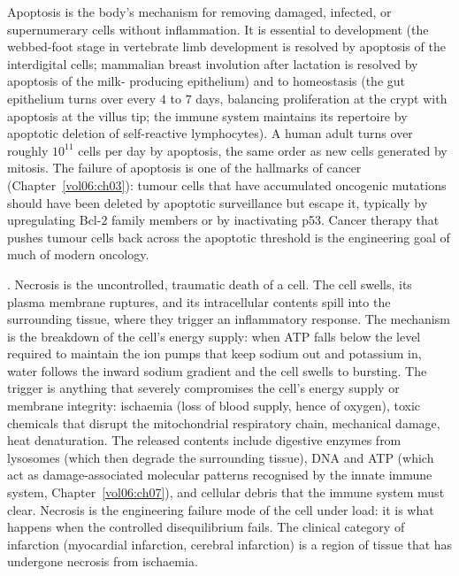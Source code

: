 Apoptosis is the body's mechanism for removing damaged, infected, or
supernumerary cells without inflammation. It is essential to
development (the webbed-foot stage in vertebrate limb development is
resolved by apoptosis of the interdigital cells; mammalian breast
involution after lactation is resolved by apoptosis of the milk-
producing epithelium) and to homeostasis (the gut epithelium turns
over every $4$ to $7$ days, balancing proliferation at the crypt with
apoptosis at the villus tip; the immune system maintains its
repertoire by apoptotic deletion of self-reactive lymphocytes). A
human adult turns over roughly $10^{11}$ cells per day by apoptosis,
the same order as new cells generated by mitosis. The failure of
apoptosis is one of the hallmarks of cancer
(Chapter~\ref{vol06:ch03}): tumour cells that have accumulated
oncogenic mutations should have been deleted by apoptotic
surveillance but escape it, typically by upregulating Bcl-2 family
members or by inactivating p53. Cancer therapy that pushes tumour
cells back across the apoptotic threshold is the engineering goal
of much of modern oncology.

. Necrosis is the uncontrolled, traumatic death of a
cell. The cell swells, its plasma membrane ruptures, and its
intracellular contents spill into the surrounding tissue, where they
trigger an inflammatory response. The mechanism is the breakdown of
the cell's energy supply: when ATP falls below the level required to
maintain the ion pumps that keep sodium out and potassium in, water
follows the inward sodium gradient and the cell swells to bursting.
The trigger is anything that severely compromises the cell's energy
supply or membrane integrity: ischaemia (loss of blood supply, hence
of oxygen), toxic chemicals that disrupt the mitochondrial respiratory
chain, mechanical damage, heat denaturation. The released contents
include digestive enzymes from lysosomes (which then degrade the
surrounding tissue), DNA and ATP (which act as damage-associated
molecular patterns recognised by the innate immune system,
Chapter~\ref{vol06:ch07}), and cellular debris that the immune system
must clear. Necrosis is the engineering failure mode of the cell
under load: it is what happens when the controlled disequilibrium
fails. The clinical category of infarction (myocardial infarction,
cerebral infarction) is a region of tissue that has undergone necrosis
from ischaemia.

